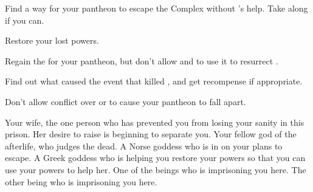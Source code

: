 \documentclass[char]{guardians}
\begin{document}
\begin{itemz}[Goals]
  \item Find a way for your pantheon to escape the Complex without \cSet{}'s help. Take \cHel{} along if you can.
  \item Restore your lost powers.
  \item Regain the \iNecro{} for your pantheon, but don't allow \cIsis{} and \cAnubis{} to use it to resurrect \cSet{}.
  \item Find out what caused the event that killed \cEgyptianHuman{}, and get recompense if appropriate.
  \item Don't allow conflict over \cEgyptianHuman{} or \cSet{} to cause your pantheon to fall apart.
\end{itemz}

\begin{contacts}
  \contact{\cIsis{}} Your wife, the one person who has prevented you from losing your sanity in this prison. Her desire to raise \cSet{} is beginning to separate you.
  \contact{\cAnubis{}} Your fellow god of the afterlife, who judges the dead.
  \contact{\cHel{}} A Norse goddess who is in on your plans to escape.
  \contact{\cHera{}} A Greek goddess who is helping you restore your powers so that you can use your powers to help her.
  \contact{\cCaretaker{}} One of the beings who is imprisoning you here.
  \contact{\cWarden{}} The other being who is imprisoning you here.
\end{contacts}
\end{document}
